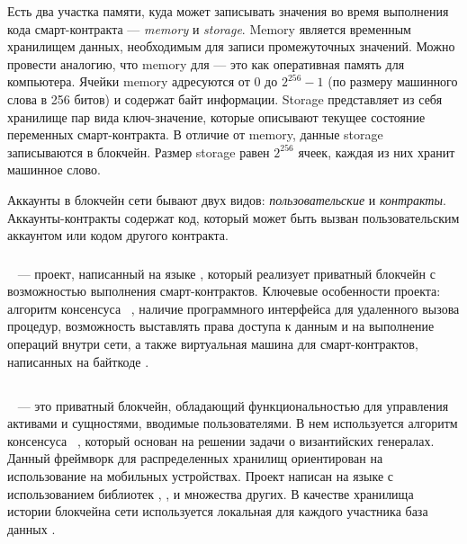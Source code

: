 Есть два участка памяти, куда  может записывать значения во время выполнения кода смарт-контракта --- \emph{memory} и \emph{storage}.
Memory является временным хранилищем данных, необходимым для записи промежуточных значений. 
Можно провести аналогию, что memory для  --- это как оперативная память для компьютера.
Ячейки memory адресуются от 0 до $2^{256} - 1$ (по размеру машинного слова  в 256 битов) и содержат байт информации.
Storage представляет из себя хранилище пар вида ключ-значение, которые описывают текущее состояние переменных смарт-контракта.
В отличие от memory, данные storage записываются в блокчейн.
Размер storage равен $2^{256}$ ячеек, каждая из них хранит машинное слово.

Аккаунты в блокчейн сети  бывают двух видов: \emph{пользовательские} и \emph{контракты}.
Аккаунты-контракты содержат код, который может быть вызван пользовательским аккаунтом или кодом другого контракта.

\subsubsection{}
~\cite{HLBurrow} --- проект, написанный на языке , который реализует приватный блокчейн с возможностью выполнения смарт-контрактов.
Ключевые особенности проекта: алгоритм консенсуса ~\cite{Tendermint}, наличие программного интерфейса для удаленного вызова процедур, возможность выставлять права доступа к данным и на выполнение операций внутри сети, а также виртуальная машина для смарт-контрактов, написанных на байткоде .


\subsection{}
~\cite{iroha} --- это приватный блокчейн, обладающий функциональностью для управления активами и сущностями, вводимые пользователями.
В нем используется алгоритм консенсуса ~\cite{YAC}, который основан на решении задачи о византийских генералах.
Данный фреймворк для распределенных хранилищ ориентирован на использование на мобильных устройствах.
Проект написан на языке  с использованием библиотек , ,  и множества других.
В качестве хранилища истории блокчейна сети используется локальная для каждого участника база данных .

